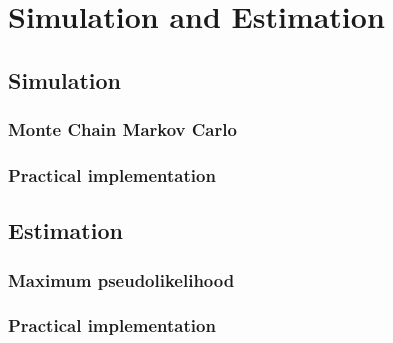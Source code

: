 \chapter{Simulation and Estimation}
\section{Simulation}
\subsection{Monte Chain Markov Carlo}
\subsection{Practical implementation}

\section{Estimation}
\subsection{Maximum pseudolikelihood}
\subsection{Practical implementation}
